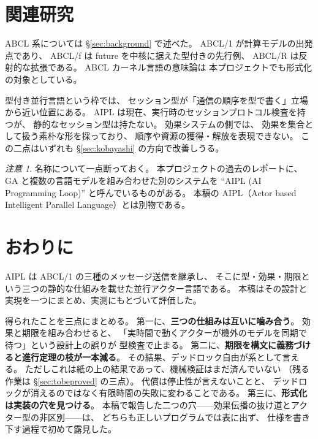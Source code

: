 \documentclass[11pt,a4paper]{ltjsarticle}
\theoremstyle{definition}
\theoremstyle{remark}
\newtheorem{remark}[theorem]{注意}
\begin{document}
\section{関連研究}

ABCL 系については \S\ref{sec:background} で述べた。
ABCL/1\cite{abcl1,abclbook} が計算モデルの出発点であり、
ABCL/f\cite{abclf} は future を中核に据えた型付きの先行例、
ABCL/R\cite{abclr} は反射的な拡張である。
ABCL カーネル言語の意味論\cite{abclkernel}は
本プロジェクトでも形式化の対象としている。

型付き並行言語という枠では、
セッション型が「通信の順序を型で書く」立場から近い位置にある。
AIPL は現在、実行時のセッションプロトコル検査を持つが、
静的なセッション型は持たない。
効果システムの側では、
効果を集合として扱う素朴な形を採っており、
順序や資源の獲得・解放を表現できない。
この二点はいずれも \S\ref{sec:kobayashi} の方向で改善しうる。

\begin{remark}
名称について一点断っておく。
本プロジェクトの過去のレポートに、
GA と複数の言語モデルを組み合わせた別のシステムを
``AIPL (AI Programming Loop)'' と呼んでいるものがある\cite{selfga}。
本稿の AIPL（Actor based Intelligent Parallel Language）とは別物である。
\end{remark}

\section{おわりに}

AIPL は ABCL/1 の三種のメッセージ送信を継承し、
そこに型・効果・期限という三つの静的な仕組みを載せた並行アクター言語である。
本稿はその設計と実現を一つにまとめ、実測にもとづいて評価した。

得られたことを三点にまとめる。
第一に、\textbf{三つの仕組みは互いに噛み合う}。
効果と期限を組み合わせると、
「実時間で動くアクターが機外のモデルを同期で待つ」という設計上の誤りが
型検査で止まる。
第二に、\textbf{期限を構文に義務づけると進行定理の枝が一本減る}。
その結果、デッドロック自由が系として言える。
ただしこれは紙の上の結果であって、機械検証はまだ済んでいない
（残る作業は \S\ref{sec:tobeproved} の三点）。
代償は停止性が言えないことと、
デッドロックが消えるのではなく有限時間の失敗に変わることである。
第三に、\textbf{形式化は実装の穴を見つける}。
本稿で報告した二つの穴——効果伝播の抜け道とアクター型の非区別——は、
どちらも正しいプログラムでは表に出ず、
仕様を書き下す過程で初めて露見した。
\end{document}
